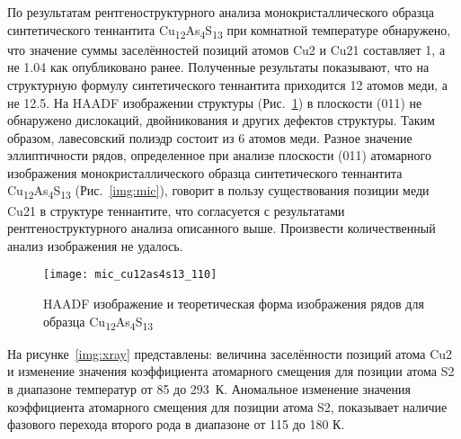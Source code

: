 По результатам рентгеноструктурного анализа монокристаллического образца синтетического теннантита Cu\textsubscript{12}As\textsubscript{4}S\textsubscript{13} при комнатной температуре обнаружено, что значение суммы заселённостей позиций атомов Cu2 и Cu21 составляет 1, а не 1.04 как опубликовано ранее\cite{Makovicky_2006}.
Полученные результаты показывают, что на структурную формулу синтетического теннантита приходится 12 атомов меди, а не 12.5. На HAADF изображении структуры (Рис.~\ref{img:mic3}) в плоскости (011) не обнаружено дислокаций, двойникования и других дефектов структуры.
Таким образом, лавесовский полиэдр состоит из 6 атомов меди.
Разное значение эллиптичности рядов, определенное при анализе плоскости (011) атомарного изображения монокристаллического образца синтетического теннантита Cu\textsubscript{12}As\textsubscript{4}S\textsubscript{13} (Рис.~\ref{img:mic}), говорит в пользу существования позиции меди Cu21 в структуре теннантите, что согласуется с результатами рентгеноструктурного анализа описанного выше. Произвести количественный анализ изображения не удалось.

\begin{figure}[h]
\centering
  \begin{minipage}[ht]{0.7\linewidth}\centering
    \texttt{[image: mic\_cu12as4s13\_110]} \\
  \end{minipage}

  \caption[HAADF изображение и теоретическая форма изображения рядов для образца Cu\textsubscript{12}As\textsubscript{4}S\textsubscript{13}]{HAADF изображение и теоретическая форма изображения рядов для образца Cu\textsubscript{12}As\textsubscript{4}S\textsubscript{13}}
    \label{img:mic3}
\end{figure}

На рисунке~\ref{img:xray} представлены: величина заселённости позиций атома Cu2 и изменение значения коэффициента атомарного смещения для позиции атома S2 в диапазоне температур от 85 до 293~К. Аномальное изменение значения коэффициента атомарного смещения для позиции атома S2, показывает наличие фазового перехода второго рода в диапазоне от 115 до 180 К.

